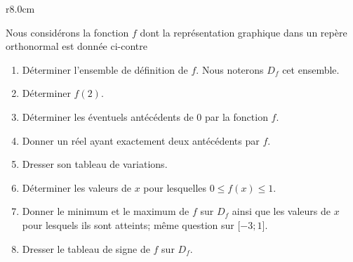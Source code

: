 
\begin{exercice}\label{exosmath-0547}

\begin{wrapfigure}{r}{8.0cm}
   \vspace{-0.5cm}        %
   \centering
   
\end{wrapfigure}

Nous considérons la fonction \( f\) dont la représentation graphique dans un repère orthonormal est donnée ci-contre 
\begin{enumerate}
    \item
        Déterminer l'ensemble de définition de \( f\). Nous noterons \( D_f\) cet ensemble.
    \item
        Déterminer \( f(2)\).
    \item
        Déterminer les éventuels antécédents de \( 0\) par la fonction \( f\).
    \item
        Donner un réel ayant exactement deux antécédents par \( f\).
    \item
        Dresser son tableau de variations.
    \item
        Déterminer les valeurs de \( x\) pour lesquelles \( 0\leq f(x)\leq 1\).
    \item
        Donner le minimum et le maximum de \( f\) sur \( D_f\) ainsi que les valeurs de \( x\) pour lesquels ils sont atteints; même question sur \( \mathopen[ -3 ; 1 \mathclose]\).
    \item
        Dresser le tableau de signe de \( f\) sur \( D_f\).
\end{enumerate}

\end{exercice}
